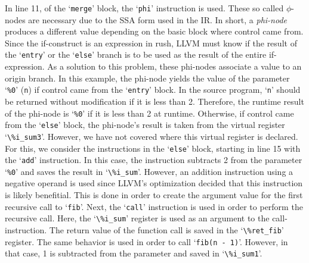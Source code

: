 In line 11, of the `\texttt{merge}' block, the `\texttt{phi}' instruction is used.
These so called $\phi$-nodes are necessary due to the SSA form used in the IR\@.
In short, a \emph{phi-node} produces a different value depending on the basic block where control came from.
Since the if-construct is an expression in rush, LLVM must know if the result of the `\texttt{entry}' or the `\texttt{else}' branch is to be used as the result of the entire if-expression.
As a solution to this problem, these phi-nodes associate a value to an origin branch.
In this example, the phi-node yields the value of the parameter `\texttt{\%0}' (\texttt{n}) if control came from the `\texttt{entry}' block.
In the source program, `\texttt{n}' should be returned without modification if it is less than 2.
Therefore, the runtime result of the phi-node is `\texttt{\%0}' if it is less than 2 at runtime.
Otherwise, if control came from the `\texttt{else}' block, the phi-node's result is taken from the virtual register `\Verb|\%i_sum3|'.
However, we have not covered where this virtual register is declared.
For this, we consider the instructions in the `\texttt{else}' block, starting in line 15 with the `\texttt{add}' instruction.
In this case, the instruction subtracts 2 from the parameter `\texttt{\%0}' and saves the result in `\Verb|\%i_sum|'.
However, an addition instruction using a negative operand is used since LLVM's optimization decided that this instruction is likely benefitial.
This is done in order to create the argument value for the first recursive call to `\texttt{fib}'.
Next, the `\texttt{call}' instruction is used in order to perform the recursive call.
Here, the `\Verb|\%i_sum|' register is used as an argument to the call-instruction.
The return value of the function call is saved in the `\Verb|\%ret_fib|' register.
The same behavior is used in order to call `\texttt{fib(n - 1)}'.
However, in that case, 1 is subtracted from the parameter and saved in `\Verb|\%i_sum1|'.

